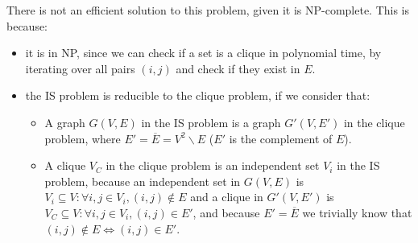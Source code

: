 {There is not an efficient solution to this problem, given it is NP-complete. This is because:
\begin{itemize}
    \item it is in NP, since we can check if a set is a clique in polynomial time, by iterating over all pairs $(i,j)$ and check if they exist in $E$.
    \item the IS problem is reducible to the clique problem, if we consider that:
    \begin{itemize}
        \item A graph $G(V,E)$ in the IS problem is a graph $G'(V,E')$ in the clique problem, where $E' = \overline{E} = V^2 \backslash E$ ($E'$ is the complement of $E$).
        \item A clique $V_C$ in the clique problem is an independent set $V_i$ in the IS problem, because an independent set in $G(V,E)$ is $V_i \subseteq V : \forall i, j \in V_i, (i,j) \not \in E$ and a clique in $G'(V,E')$ is $V_C \subseteq V : \forall i, j \in V_i, (i,j) \in E'$, and because $E'=\overline{E}$ we trivially know that $(i,j) \not \in E \iff (i,j) \in E'$.
    \end{itemize}
\end{itemize}

}
